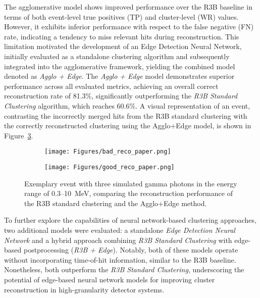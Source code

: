 The agglomerative model shows improved performance over the R3B baseline in terms of both event-level true positives (TP) and cluster-level (WR) values. However, it exhibits inferior performance with respect to the false negative (FN) rate, indicating a tendency to miss relevant hits during reconstruction. This limitation motivated the development of an Edge Detection Neural Network, initially evaluated as a standalone clustering algorithm and subsequently integrated into the agglomerative framework, yielding the combined model denoted as \textit{Agglo + Edge}.\newline
The \textit{Agglo + Edge} model demonstrates superior performance across all evaluated metrics, achieving an overall correct reconstruction rate of 81.3\%, significantly outperforming the \textit{R3B Standard Clustering} algorithm, which reaches 60.6\%.\newline
A visual representation of an event, contrasting the incorrectly merged hits from the R3B standard clustering with the correctly reconstructed clustering using the Agglo+Edge model, is shown in Figure~\ref{fig:comparison_r3b_agglo_edge}.\newline
\begin{figure}[htbp]
    \centering
    \begin{subfigure}[b]{0.45\textwidth}
        \texttt{[image: Figures/bad\_reco\_paper.png]}
        \centering
        \label{fig:subfig1}
    \end{subfigure}
    \hfill
    \begin{subfigure}[b]{0.45\textwidth}
        \texttt{[image: Figures/good\_reco\_paper.png]}
        \centering
        \label{fig:subfig2}
    \end{subfigure}
    \caption{Exemplary event with three simulated gamma photons in the energy range of 0.3–10~MeV, comparing the reconstruction performance of the R3B standard clustering and the Agglo+Edge method.}
    \label{fig:comparison_r3b_agglo_edge}
\end{figure}
To further explore the capabilities of neural network-based clustering approaches, two additional models were evaluated: a standalone \textit{Edge Detection Neural Network} and a hybrid approach combining \textit{R3B Standard Clustering} with edge-based postprocessing (\textit{R3B + Edge}). Notably, both of these models operate without incorporating time-of-hit information, similar to the R3B baseline. Nonetheless, both outperform the \textit{R3B Standard Clustering}, underscoring the potential of edge-based neural network models for improving cluster reconstruction in high-granularity detector systems.\newline
